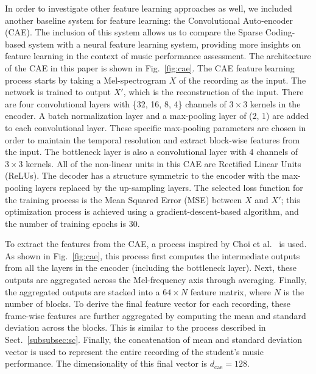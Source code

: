 \documentclass{ws-ijsc}
\begin{document}
In order to investigate other feature learning approaches as well, we included another baseline system for feature learning: the Convolutional Auto-encoder (CAE). The inclusion of this system allows us to compare the Sparse Coding-based system with a neural feature learning system, providing more insights on feature learning in the context of music performance assessment. The architecture of the CAE in this paper is shown in Fig.~\ref{fig:cae}.
The CAE feature learning process starts by taking a Mel-spectrogram $X$ of the recording as the input. The network is trained to output $X'$, which is the reconstruction of the input. 
There are four convolutional layers with \{32, 16, 8, 4\} channels of $3 \times 3$ kernels in the encoder. A batch normalization layer and a max-pooling layer of (2, 1) are added to each convolutional layer. These specific max-pooling parameters are chosen in order to maintain the temporal resolution and extract block-wise features from the input.
The bottleneck layer is also a convolutional layer with 4 channels of $3 \times 3$ kernels. 
All of the non-linear units in this CAE are Rectified Linear Units (ReLUs).
The decoder has a structure symmetric to the encoder with the max-pooling layers replaced by the up-sampling layers.  
The selected loss function for the training process is the Mean Squared Error (MSE) between $X$ and $X'$; this optimization process is achieved using a gradient-descent-based algorithm, and the number of training epochs is $30$. 

To extract the features from the CAE, a process inspired by Choi et al.~\cite{Choi2017a} is used. As shown in Fig.~\ref{fig:cae}, this process first computes the intermediate outputs from all the layers in the encoder (including the bottleneck layer). Next, these outputs are aggregated across the Mel-frequency axis through averaging. Finally, the aggregated outputs are stacked into a $64 \times N$ feature matrix, where $N$ is the number of blocks. 
To derive the final feature vector for each recording, these frame-wise features are further aggregated by computing the mean and standard deviation across the blocks. This is similar to the process described in Sect.~\ref{subsubsec:sc}. Finally, the concatenation of mean and standard deviation vector is used to represent the entire recording of the student's music performance. The dimensionality of this final vector is $d_\mathrm{cae} = 128$.
\end{document}
